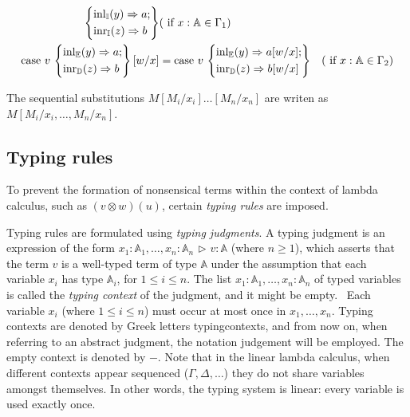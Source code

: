 \begin{definition}
\begin{align*}
  \left\{
    \begin{aligned} 
    &\mathrm{inl}_{\mathbb{I}}(y) \Rightarrow a; \\
    &\mathrm{inr}_{\mathbb{I}}(z) \Rightarrow  b  \\ 
  \end{aligned}  
  \right\}  &  (\text{ if } x: \mathbb{A} \in \Gamma_1) \\
  \text{case } v \,  
  \left\{
    \begin{aligned} 
    &\mathrm{inl}_{\mathbb{E}}(y) \Rightarrow a; \\
    &\mathrm{inr}_{\mathbb{D}}(z) \Rightarrow  b  \\ 
  \end{aligned}  
  \right\}[w/x] &=  \text{case } v   \,  
  \left\{
    \begin{aligned} 
    &\mathrm{inl}_{\mathbb{E}}(y) \Rightarrow a [w/x]; \\
    &\mathrm{inr}_{\mathbb{D}}(z) \Rightarrow  b [w/x]  \\ 
  \end{aligned}  
  \right\}  &  (\text{ if } x: \mathbb{A} \in \Gamma_2) \\
\end{align*}
\end{definition}




The sequential substitutions $M[M_i/x_i] \ldots [M_n/x_n]$ are writen as $M[M_i/x_i, \ldots ,M_n/x_n]$.


\subsection{Typing rules}

To prevent the formation of nonsensical terms within the context of lambda calculus, such as $(v \otimes w) (u)$, certain \emph{typing rules} are imposed.

Typing rules are formulated using \emph{typing judgments}. A typing judgment is an expression of the form $x_{1}: \mathbb{A}_{1}, \ldots, x_{n}: \mathbb{A}_{n} \hspace{1pt} \triangleright \hspace{1pt} v: \mathbb{A}$ (where $n \geq 1$), which asserts that the term $v$ is a well-typed term of type $\mathbb{A}$ under the assumption that each variable $x_{i}$ has type $\mathbb{A}_{i}$, for $1 \leq i \leq n$. The list $x_{1}: \mathbb{A}_{1}, \ldots, x_{n}: \mathbb{A}_{n}$ of typed variables is called the \emph{typing context} of the judgment, and it might be empty.  Each variable $x_i$ (where $1 \leq i \leq n$) must occur at most once in $x_1, \ldots, x_n$. Typing contexts are denoted by Greek letters \gls{typingcontexts}, and from now on, when referring to an abstract judgment, the notation \gls{judgement} will be employed.
The empty context is denoted by $-$. Note that in the linear lambda calculus, when different contexts appear sequenced (\eg $\Gamma, \Delta, \ldots$) they do not share variables amongst themselves. In other words, the typing system is linear: every variable is used exactly once.

